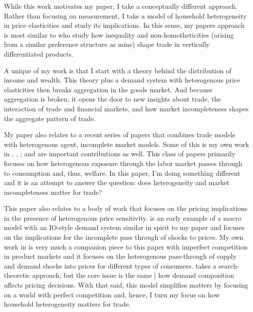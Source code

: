 \documentclass[12pt,pdftex]{article}
\begin{document}
\begin{onehalfspacing}
While this work motivates my paper, I take a conceptually different approach. Rather than focusing on measurement, I take a model of household heterogeneity in price elasticities and study its implications. In this sense, my papers approach is most similar to \citet{fajgelbaum2011income} who study how inequality and non-homotheticities (arising from a similar preference structure as mine) shape trade in vertically differentiated products.

A unique of my work is that I start with a theory behind the distribution of income and wealth. This theory plus a demand system with heterogenous price elasticities then breaks aggregation in the goods market. And because aggregation is broken, it opens the door to new insights about trade, the interaction of trade and financial markets, and how market incompleteness shapes the aggregate pattern of trade.

My paper also relates to a recent series of papers that combines trade models with heterogenous agent, incomplete market models. Some of this is my own work in \citet{lyon2018redistributing}, \citet{lyon2019}, \citet{waugh_consumption}; \citet*{gaston2018} and \citet{carroll2020heterogeneous} are important contributions as well. This class of papers primarily focuses on how heterogenous exposure through the labor market passes through to consumption and, thus, welfare. In this paper, I'm doing something different and it is an attempt to answer the question: does heterogeneity and market incompleteness matter for trade?


This paper also relates to a body of work that focuses on the pricing implications in the presence of heterogenous price sensitivity. \citet{nakamura2010accounting} is an early example of a macro model with an IO-style demand system similar in spirit to my paper and focuses on the implications for the incomplete pass through of shocks to prices. My own work in \citet{p-iq} is very much a companion piece to this paper with imperfect competition in product markets and it focuses on the heterogenous pass-through of supply and demand shocks into prices for different types of consumers. \citet{nord2022shopping} takes a search-theoretic approach, but the core issue is the same | how demand composition affects pricing decisions. With that said, this model simplifies matters by focusing on a world with perfect competition and, hence, I turn my focus on how household heterogeneity matters for trade.







\end{onehalfspacing}
\end{document}
